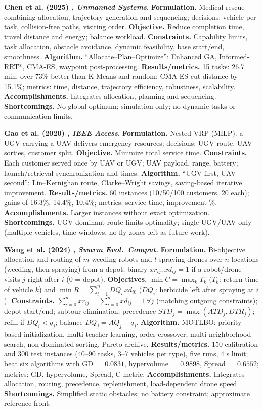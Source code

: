 \textbf{Chen et al. (2025) \cite{chen}, \emph{Unmanned Systems}.} \textbf{Formulation.} Medical rescue combining allocation, trajectory generation and sequencing; decisions: vehicle per task, collision-free paths, visiting order. \textbf{Objective.} Reduce completion time, travel distance and energy; balance workload. \textbf{Constraints.} Capability limits, task allocation, obstacle avoidance, dynamic feasibility, base start/end, smoothness. \textbf{Algorithm.} ``Allocate--Plan--Optimize'': Enhanced GA, Informed-RRT*, CMA-ES, waypoint post-processing. \textbf{Results/metrics.} 15 tasks: 26.7 min, over 73\% better than K-Means and random; CMA-ES cut distance by 15.1\%; metrics: time, distance, trajectory efficiency, robustness, scalability. \textbf{Accomplishments.} Integrates allocation, planning and sequencing. \textbf{Shortcomings.} No global optimum; simulation only; no dynamic tasks or communication limits.
 
\textbf{Gao et al. (2020) \cite{gao}, \emph{IEEE Access}.} \textbf{Formulation.} Nested VRP (MILP): a UGV carrying a UAV delivers emergency resources; decisions: UGV route, UAV sorties, customer split. \textbf{Objective.} Minimize total service time. \textbf{Constraints.} Each customer served once by UAV or UGV; UAV payload, range, battery; launch/retrieval synchronization and times. \textbf{Algorithm.} ``UGV first, UAV second'': Lin--Kernighan route, Clarke--Wright savings, saving-based iterative improvement. \textbf{Results/metrics.} 60 instances (10/50/100 customers, 20 each); gains of 16.3\%, 14.4\%, 10.4\%; metrics: service time, improvement \%. \textbf{Accomplishments.} Larger instances without exact optimization. \textbf{Shortcomings.} UGV-dominant route limits optimality; single UGV/UAV only (multiple vehicles, time windows, no-fly zones left as future work).
 
\textbf{Wang et al. (2024) \cite{wang}, \emph{Swarm Evol.\ Comput.}} \textbf{Formulation.} Bi-objective allocation and routing of $m$ weeding robots and $l$ spraying drones over $n$ locations (weeding, then spraying) from a depot; binary $xr_{ij},xd_{ij}=1$ if a robot/drone visits $j$ right after $i$ (0 = depot). \textbf{Objectives.} $\min C=\max_k T_k$ ($T_k$: return time of vehicle $k$) and $\min R=\sum_{i=1}^{n}DQ_i\,xd_{i0}$ ($DQ_i$: herbicide left after spraying at $i$). \textbf{Constraints.} $\sum_{i=0}^{n}xr_{ij}=\sum_{i=0}^{n}xd_{ij}=1\ \forall j$ (matching outgoing constraints); depot start/end; subtour elimination; precedence $STD_j=\max(ATD_j,DTR_j)$; refill if $DQ_i<q_j$; balance $DQ_j=AQ_j-q_j$. \textbf{Algorithm.} MOTLBO: priority-based initialization, multi-teacher learning, order crossover, multi-neighborhood search, non-dominated sorting, Pareto archive. \textbf{Results/metrics.} 150 calibration and 300 test instances (40--90 tasks, 3--7 vehicles per type), five runs, 4 s limit; beat six algorithms with GD $=0.0831$, hypervolume $=0.9898$, Spread $=0.6552$; metrics: GD, hypervolume, Spread, C-metric. \textbf{Accomplishments.} Integrates allocation, routing, precedence, replenishment, load-dependent drone speed. \textbf{Shortcomings.} Simplified static obstacles; no battery constraint; approximate reference front.
 
